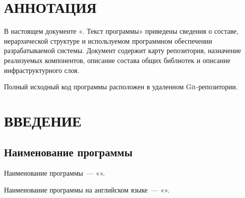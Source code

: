 \documentclass[12pt,a4paper]{extarticle}
\begin{document}
\sloppy






\section*{АННОТАЦИЯ}

В настоящем документе «\projectname. Текст программы» приведены сведения о составе, иерархической структуре и используемом программном обеспечении разрабатываемой системы. Документ содержит карту репозитория, назначение реализуемых компонентов, описание состава общих библиотек и описание инфраструктурного слоя.

Полный исходный код программы расположен в удаленном Git-репозитории. 

\clearpage

\hypersetup{linkcolor=black}
\tableofcontents
\hypersetup{linkcolor=blue}
\thispagestyle{fancy}
\clearpage

\section{ВВЕДЕНИЕ}

\subsection{Наименование программы}

Наименование программы~--- «\projectname».

Наименование программы на английском языке~--- «\hseProjectNameEn».
\end{document}
